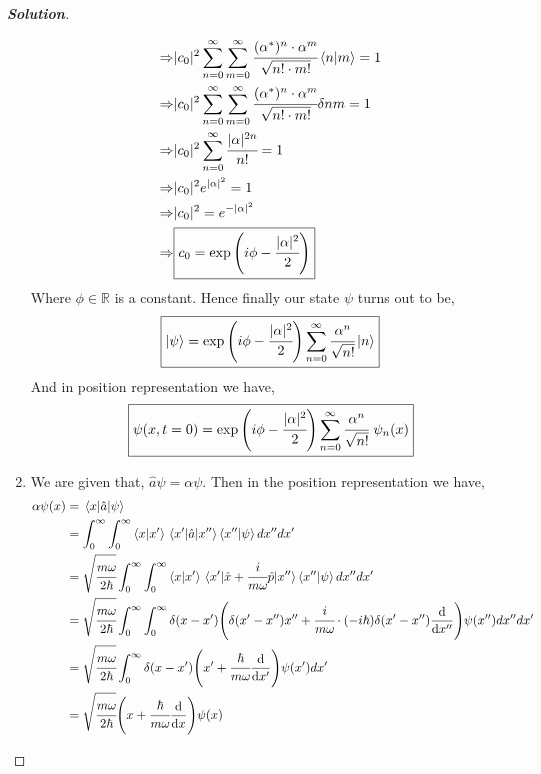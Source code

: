 \documentclass[10pt]{scrartcl}
\theoremstyle{definition}
\newenvironment{solution} {\begin{proof}[\normalfont \textbf{Solution}]} {\end{proof}}
\newcommand{\rn}{\mathbb{R}}
\newcommand*{\Op}{\hat{p}}
\newcommand*{\Ox}{\hat{x}}
\newcommand*{\Oa}{\hat{a}}
\begin{document}
\begin{solution}
\begin{enumerate}[label=(\alph*)]
\begin{align*}
                \Rightarrow &|c_0|^2 \sum_{n = 0}^{\infty} \sum_{m = 0}^{\infty} \cfrac{(\alpha^*)^n \cdot \alpha^m}{\sqrt{n! \cdot m!}} \ip{n}{m}  = 1\\
                \Rightarrow &|c_0|^2 \sum_{n = 0}^{\infty} \sum_{m = 0}^{\infty} \cfrac{(\alpha^*)^n \cdot \alpha^m}{\sqrt{n! \cdot m!}} \delta{nm}  = 1\\
                \Rightarrow &|c_0|^2 \sum_{n = 0}^{\infty} \cfrac{|\alpha|^{2n}}{n!} = 1\\
                \Rightarrow &|c_0|^2 e^{|\alpha|^2} = 1 \\ 
                \Rightarrow &|c_0|^2 = e^{-|\alpha|^2} \\
                \Rightarrow &\boxed{c_0 = \exp\qty(i\phi - \cfrac{|\alpha|^2}{2})}
            \end{align*}
            Where $\phi \in \rn$ is a constant. Hence finally our state $\psi$ turns out to be, 
            $$\boxed{\ket\psi = \exp\qty(i\phi - \cfrac{|\alpha|^2}{2}) \sum_{n = 0}^{\infty} \cfrac{\alpha^n}{\sqrt{n!}}\ket n}$$
            And in position representation we have,
            $$\boxed{\psi(x, t = 0) = \exp\qty(i\phi - \cfrac{|\alpha|^2}{2}) \sum_{n = 0}^{\infty} \cfrac{\alpha^n}{\sqrt{n!}} ~ \psi_n(x)}$$
        \item We are given that, $\Oa \psi = \alpha \psi$. Then in the position representation we have,
            \begin{align*}
                \alpha \psi(x) &= \mel{x}{\Oa}{\psi}\\ 
                               &= \int_0^\infty \int_0^\infty \ip{x}{x'}\mel{x'}{\Oa}{x''}\ip{x''}{\psi} dx'' dx' \\ 
                               &= \sqrt{\cfrac{m\omega}{2\hbar}}\int_0^\infty \int_0^\infty \ip{x}{x'}\mel{x'}{\Ox + \cfrac{i}{m\omega}\Op}{x''}\ip{x''}{\psi} dx'' dx' \\ 
                               &= \sqrt{\cfrac{m\omega}{2\hbar}}\int_0^\infty \int_0^\infty \delta(x - x')\qty(\delta(x'-x'')x'' + \cfrac{i}{m\omega}\cdot \qty(-i\hbar) \delta(x'-x'')\dv{x''})\psi(x'') dx'' dx' \\ 
                               &= \sqrt{\cfrac{m\omega}{2\hbar}}\int_0^\infty \delta(x -x')\qty(x' + \cfrac{\hbar}{m\omega}\dv{x'})\psi(x') dx' \\ 
                               &= \sqrt{\cfrac{m\omega}{2\hbar}}\qty(x + \cfrac{\hbar}{m\omega}\dv{x})\psi(x) \\ 
            \end{align*}

\end{enumerate}
\end{solution}
\end{document}

